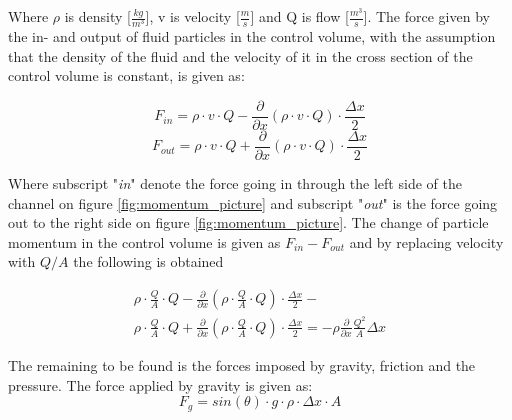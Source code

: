 Where $\rho$ is density [$\frac{kg}{m^3}$], v is velocity [$\frac{m}{s}$] and Q is flow [$\frac{m^3}{s}$].
The force given by the in- and output of fluid particles in the control volume, with the assumption that the density of the fluid and the velocity of it in the cross section of the control volume is constant, is given as:

\begin{equation}
	F_{in}= \rho \cdot v \cdot Q - \frac{\partial}{\partial x}(\rho \cdot v \cdot Q) \cdot \frac{\Delta x}{2}
\end{equation}
\begin{equation}
	F_{out} = \rho \cdot v \cdot Q + \frac{\partial}{\partial x}(\rho \cdot v \cdot Q) \cdot \frac{\Delta x}{2}
\end{equation}

Where subscript "\textit{in}" denote the force going in through the left side of the channel on figure \ref{fig:momentum_picture} and subscript "\textit{out}" is the force going out to the right side on figure \ref{fig:momentum_picture}.
The change of particle momentum in the control volume is given as $F_{in}- F_{out}$ and by replacing velocity with $Q/A$ the following is obtained

\begin{equation}\label{mass_flow_speed}
\begin{array}{l}
\rho \cdot \frac{Q}{A} \cdot Q - \frac{\partial}{\partial x}\left(\rho \cdot \frac{Q}{A}  \cdot Q\right) \cdot \frac{\Delta x}{2} -\\ 
\rho \cdot \frac{Q}{A}  \cdot Q + \frac{\partial}{\partial x}\left(\rho \cdot \frac{Q}{A}  \cdot Q\right) \cdot \frac{\Delta x}{2} 
= -  \rho\frac{\partial}{\partial x} \frac{Q^2}{A}\Delta x
\end{array}
\end{equation}

The remaining to be found is the forces imposed by gravity, friction and the pressure.
The force applied by gravity is given as:
\begin{equation}
F_g = sin(\theta)\cdot g \cdot \rho \cdot \Delta x \cdot A
\label{gravity_force} 
\end{equation}

